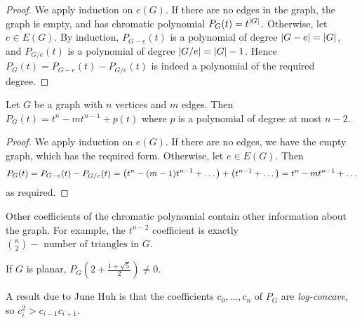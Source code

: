 \begin{proof}
	We apply induction on \( e(G) \).
	If there are no edges in the graph, the graph is empty, and has chromatic polynomial \( P_G(t) = t^{\abs{G}} \).
	Otherwise, let \( e \in E(G) \).
	By induction, \( P_{G - e}(t) \) is a polynomial of degree \( \abs{G - e} = \abs{G} \), and \( P_{G / e}(t) \) is a polynomial of degree \( \abs{G / e} = \abs{G} - 1 \).
	Hence \( P_G(t) = P_{G - e}(t) - P_{G / e}(t) \) is indeed a polynomial of the required degree.
\end{proof}
\begin{proposition}
	Let \( G \) be a graph with \( n \) vertices and \( m \) edges.
	Then \( P_G(t) = t^n - mt^{n-1} + p(t) \) where \( p \) is a polynomial of degree at most \( n - 2 \).
\end{proposition}
\begin{proof}
	We apply induction on \( e(G) \).
	If there are no edges, we have the empty graph, which has the required form.
	Otherwise, let \( e \in E(G) \).
	Then
	\[ P_G(t) = P_{G - e}(t) - P_{G/e}(t) = \qty(t^n - (m - 1)t^{n-1} + \dots) + \qty(t^{n-1} + \dots) = t^n - mt^{n-1} + \dots \]
	as required.
\end{proof}
\begin{remark}
	Other coefficients of the chromatic polynomial contain other information about the graph.
	For example, the \( t^{n-2} \) coefficient is exactly \( \binom n 2 - \text{ number of triangles in } G \).

	If \( G \) is planar, \( P_G(2+\frac{1+\sqrt{5}}{2}) \neq 0 \).

	A result due to June Huh is that the coefficients \( c_0, \dots, c_n \) of \( P_G \) are \emph{log-concave}, so \( c_i^2 > c_{i-1}c_{i+1} \).
\end{remark}
